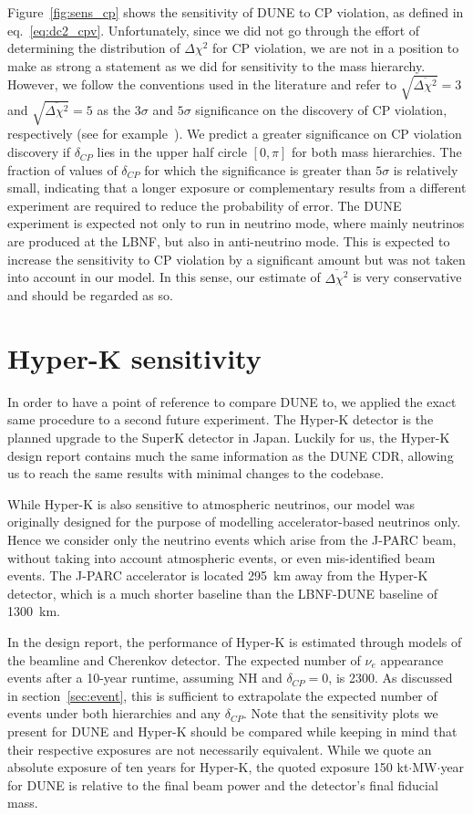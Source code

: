 Figure~\ref{fig:sens_cp} shows the sensitivity of DUNE to CP violation, as
defined in eq.~\ref{eq:dc2_cpv}. Unfortunately, since we did not go through the effort of
determining the distribution of $\Delta\chi^2$ for CP violation, we are not in
a position to make as strong a statement as we did for sensitivity to the mass hierarchy.
However, we follow the conventions used in the literature and refer to
$\sqrt{\overline{\Delta\chi^2}}=3$ and $\sqrt{\overline{\Delta\chi^2}}=5$ as
the $3\sigma$ and $5\sigma$ significance on the discovery of CP violation,
respectively (see
for example~\cite{ballett, martin-albo, laguna-lbno, masud}). We predict a greater
significance on CP violation discovery if $\delta_{CP}$ lies in the upper half circle
$[0, \pi]$ for both mass hierarchies. The fraction of values of $\delta_{CP}$
for which the significance is greater than $5\sigma$ is relatively small,
indicating that a longer exposure or complementary results from a different
experiment are required to reduce the probability of error.
The DUNE experiment is expected not only to run in neutrino mode, where mainly
neutrinos are produced at the LBNF, but also in anti-neutrino mode. This
is expected to increase the sensitivity to CP violation by a significant amount
but was not taken into account in our model. In this sense, our estimate of
$\overline{\Delta\chi^2}$ is very conservative and should be regarded as so.


\section{Hyper-K sensitivity}
In order to have a point of reference to compare DUNE to, we applied the
exact same procedure to a second future experiment. The Hyper-K detector
is the planned upgrade to the SuperK detector in Japan. Luckily for us, the
Hyper-K design report\cite{hyperk} contains much the same information as the
DUNE CDR, allowing us to reach the same results with minimal changes to
the codebase. 

While Hyper-K is also sensitive to atmospheric neutrinos, our
model was originally designed for the purpose of modelling accelerator-based
neutrinos only. Hence we consider only the neutrino events which arise from the
J-PARC beam, without taking into account atmospheric events, or even
mis-identified beam events. The J-PARC accelerator is located \SI{295}{\km}
away from the Hyper-K detector, which is a much shorter baseline than the
LBNF-DUNE baseline of \SI{1300}{\km}.

In the design report, the performance of Hyper-K is estimated through models of
the beamline and Cherenkov detector. The expected number of $\nu_e$ appearance
events after a 10-year runtime, assuming NH and $\delta_{CP}=0$, is 2300.
As discussed in section~\ref{sec:event}, this is sufficient to extrapolate the
expected number of events under both hierarchies and any $\delta_{CP}$.
Note that the sensitivity plots we present for DUNE and Hyper-K should be
compared while keeping in mind that their respective exposures are not
necessarily equivalent. While we quote an absolute exposure of ten years for
Hyper-K, the quoted exposure 150 kt$\cdot$MW$\cdot$year for DUNE is relative to
the final beam power and the detector's final fiducial mass.

